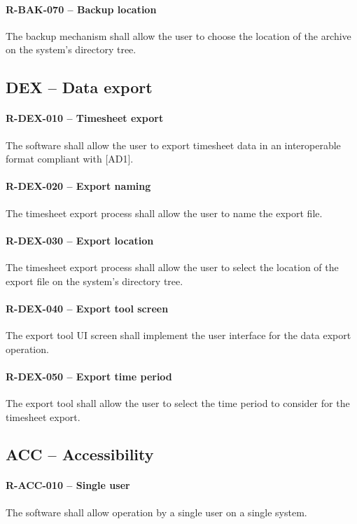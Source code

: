 \paragraph{R-BAK-070 -- Backup location}
The backup mechanism shall allow the user to choose the location of the
archive on the system's directory tree.

\subsection{DEX -- Data export}
\paragraph{R-DEX-010 -- Timesheet export}
The software shall allow the user to export timesheet data in an interoperable
format compliant with [AD1].

\paragraph{R-DEX-020 -- Export naming}
The timesheet export process shall allow the user to name the export file.

\paragraph{R-DEX-030 -- Export location}
The timesheet export process shall allow the user to select the location
of the export file on the system's directory tree.

\paragraph{R-DEX-040 -- Export tool screen}
The export tool UI screen shall implement the user interface for the data
export operation.

\paragraph{R-DEX-050 -- Export time period}
The export tool shall allow the user to select the time period to consider
for the timesheet export.

\subsection{ACC -- Accessibility}
\paragraph{R-ACC-010 -- Single user}
The software shall allow operation by a single user on a single system.

